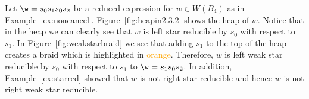 \begin{example}
	Let $\w=s_0s_1s_0s_2$ be a reduced expression for $w \in W(B_4)$ as in Example~\ref{ex:noncancel}. Figure~\ref{fig:heapin2.3.2} shows the heap of $w$. Notice that in the heap we can clearly see that $w$ is left star reducible by $s_0$ with respect to $s_1$. In Figure~\ref{fig:weakstarbraid} we see that adding $s_1$ to the top of the heap creates a braid which is highlighted in \textcolor{orange}{orange}. Therefore, $w$ is left weak star reducible by $s_0$ with respect to $s_1$ to $\w=s_1s_0s_2$. In addition, Example~\ref{ex:starred} showed that $w$ is not right star reducible and hence $w$ is not right weak star reducible.
\end{example}
  


